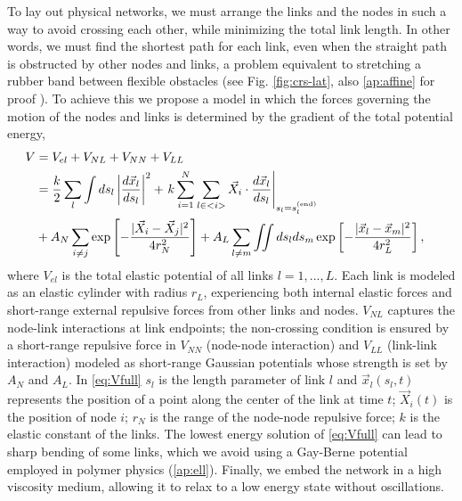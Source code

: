 \documentclass[nofootinbib,preprint,floatfix,titlepage,superscriptaddress]{revtex4} %
\begin{document}
To lay out physical networks, we must arrange the links and the nodes in such a way to avoid crossing each other, while minimizing the total link length. 
In other words, we must find the shortest path for each link, even when the straight path is obstructed by other nodes and links, a problem equivalent to stretching a rubber band between flexible obstacles (see Fig. \ref{fig:crs-lat}, also \ref{ap:affine} for proof \cite{novikov1984}). 
To achieve this we propose a model in which the forces governing the motion of the nodes and links is determined by the gradient of the total potential energy,  
\begin{align}
    V &= V_{el} + V_{NL} +V_{NN} + V_{LL} \cr 
    &= {k\over 2}\sum_l\int ds_l \left|{d\vec{x}_l\over ds_l} \right|^2 + 
    \left. k\sum_{i=1}^N  \sum_{l\in <i>}  \vec{X}_i \cdot{d\vec{x}_l%
    \over ds_l}\right|_{s_l = s_l^{(\mathrm{end})}}
    \cr
    &+ A_N\sum_{i\ne j}  \exp\left[- {|\vec{X}_i-\vec{X}_j|^2 \over 4r_N^2}\right]+A_L\sum_{l\ne m} \iint ds_lds_m 
    \exp\left[- {|\vec{x}_l-\vec{x}_m|^2 \over 4 r_L^2}\right] ,
 \label{eq:Vfull}
\end{align}
where $V_{el}$ is the total elastic potential of all links $l=1,...,L$. 
Each link is modeled as an elastic cylinder with radius $r_L$, experiencing both internal elastic forces and short-range external repulsive forces from other links and nodes. $V_{NL}$ captures the node-link interactions at link endpoints;
the non-crossing condition is ensured by a short-range repulsive force in
$V_{NN}$  (node-node interaction)  and  $V_{LL}$ (link-link interaction) modeled as short-range Gaussian potentials whose strength is set by $A_N$ and $A_L$. 
In \eqref{eq:Vfull} $s_l$ is the length parameter of link $l$ and  $\vec{x}_l(s_l,t)$ represents the position of a point along the center of the link at time $t$;
$\vec{X}_i(t)$ is the position of node $i$; $r_N$ is the range of the node-node repulsive force; $k$ is the elastic constant of the links.
The lowest energy solution of \eqref{eq:Vfull} can lead to sharp bending of some links, which we avoid using a Gay-Berne potential \cite{gay1981modification} %
employed in polymer physics %
\citep{everaers2003interaction,babadi2006coarse} (\ref{ap:ell}). 
Finally, we embed the network in a high viscosity medium, allowing it to relax to a low energy state without oscillations.
\end{document}
